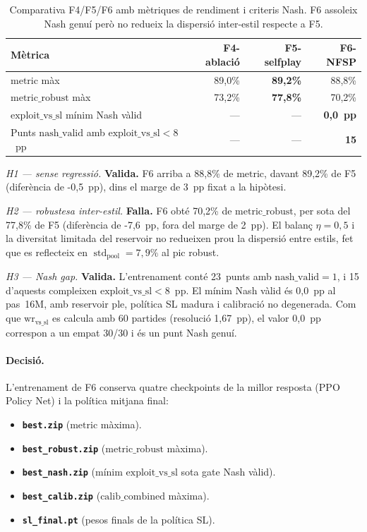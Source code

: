 \begin{table}[H]
  \centering
  \begin{tabular}{lrrr}
    \toprule
    Mètrica & F4-ablació & F5-selfplay & F6-NFSP \\
    \midrule
    \(\text{metric}\) màx & 89{,}0\% & \textbf{89{,}2\%} & 88{,}8\% \\
    \(\text{metric\_robust}\) màx & 73{,}2\% & \textbf{77{,}8\%} & 70{,}2\% \\
    \(\text{exploit\_vs\_sl}\) mínim Nash vàlid & — & — & \textbf{0{,}0~pp} \\
    Punts \(\text{nash\_valid}\) amb \(\text{exploit\_vs\_sl}<8\)~pp & — & — & \textbf{15} \\
    \bottomrule
  \end{tabular}
  \caption{Comparativa F4/F5/F6 amb mètriques de rendiment i criteris Nash.
           F6 assoleix Nash genuí però no redueix la dispersió inter-estil respecte a F5.}
  \label{tab:fase6}
\end{table}

\emph{H1 --- sense regressió.} \textbf{Valida.} F6 arriba a 88{,}8\% de
\(\text{metric}\), davant 89{,}2\% de F5 (diferència de -0{,}5~pp), dins el marge de
3~pp fixat a la hipòtesi.

\emph{H2 --- robustesa inter-estil.} \textbf{Falla.} F6 obté 70{,}2\% de
\(\text{metric\_robust}\), per sota del 77{,}8\% de F5 (diferència de -7{,}6~pp, fora del
marge de 2~pp). El balanç \(\eta=0{,}5\) i la diversitat limitada del reservoir no
redueixen prou la dispersió entre estils, fet que es reflecteix en
\(\operatorname{std}_{\text{pool}}=7{,}9\%\) al pic robust.

\emph{H3 --- Nash gap.} \textbf{Valida.} L'entrenament conté 23~punts amb
\(\text{nash\_valid}=1\), i 15 d'aquests compleixen \(\text{exploit\_vs\_sl}<8\)~pp.
El mínim Nash vàlid és 0{,}0~pp al pas~16M, amb reservoir ple, política \ac{SL} madura i
calibració no degenerada. Com que \(\text{wr}_{\text{vs\_sl}}\) es calcula amb 60
partides (resolució 1{,}67~pp), el valor 0{,}0~pp correspon a un empat 30/30 i és un
punt Nash genuí.

\paragraph{Decisió.} L'entrenament de F6 conserva quatre checkpoints de la millor resposta
(\ac{PPO} Policy Net) i la política mitjana final:

\begin{itemize}
  \item \textbf{\texttt{best.zip}} (\(\text{metric}\) màxima).
  \item \textbf{\texttt{best\_robust.zip}} (\(\text{metric\_robust}\) màxima).
  \item \textbf{\texttt{best\_nash.zip}} (mínim \(\text{exploit\_vs\_sl}\) sota gate Nash vàlid).
  \item \textbf{\texttt{best\_calib.zip}} (\(\text{calib\_combined}\) màxima).
  \item \textbf{\texttt{sl\_final.pt}} (pesos finals de la política \ac{SL}).
\end{itemize}

